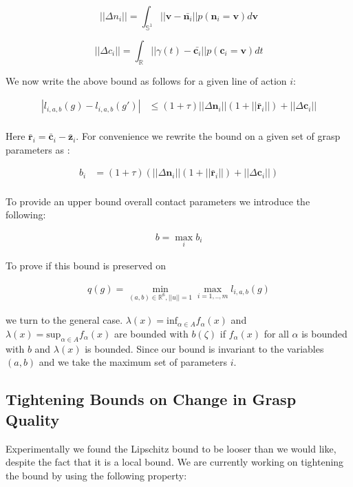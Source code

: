 \documentclass[letterpaper, 10 pt, conference]{ieeeconf}  %
\begin{document}
\[
  ||\Delta n_i|| =  \int_{\mathbb{S}^1} ||\textbf{v} - \bar{\textbf{n}_i}|| p(\textbf{n}_i = \textbf{v}) d\textbf{v}
\]

\[
  ||\Delta c_i|| =  \int_{\mathbb{R}} ||\gamma(t) - \bar{\textbf{c}_i}|| p(\textbf{c}_i = \textbf{v}) dt
\]

We now write the above bound as follows for a given line of action $i$: 

 \begin{align*}
|l_{i,a,b}(g) - l_{i,a,b}(g')| & \leq (1+\tau)||\Delta \textbf{n}_{i}||(1+||\bar{\textbf{r}}_i||) + ||\Delta{\textbf{c}_{i}}|| \\
  \end{align*}

Here $\bar{\textbf{r}}_i = \bar{\textbf{c}}_i - \bar{\textbf{z}}_i$. For convenience we rewrite the bound on a given set of grasp parameters as : 

 \begin{align*}
b_i &= (1+\tau)(||\Delta \textbf{n}_{i}||(1+||\bar{\textbf{r}}_i||) + ||\Delta{\textbf{c}_{i}}|| )\\
\end{align*}

To provide an upper bound overall contact parameters we introduce the following: 

\begin{align}
b  = \max_{i} b_i
\end{align}

To prove if  this bound is preserved on

 \begin{align}
 q(g) = \min_{(a,b) \in \mathbb{R}^6, ||u||=1} \max_{i=1,..,m} l_{i,a,b}(g)
 \end{align}
 
we turn to the general case.
$\lambda(x) = \mbox{inf}_{\alpha \in A} f_\alpha(x)$ and $\lambda(x) = \mbox{sup}_{\alpha \in A} f_\alpha(x)$ are bounded with $b(\zeta)$ if $f_\alpha(x)$ for all $\alpha$ is bounded with $b$ and $\lambda(x)$ is bounded.
Since our bound is invariant to the variables $(a,b)$ and we take the maximum set of parameters $i$.


\subsection{Tightening Bounds on Change in Grasp Quality}

Experimentally we found the Lipschitz bound to be looser than we would like, despite the fact that it is a local bound. We are currently working on tightening the bound by using the following property: 
\end{document}
